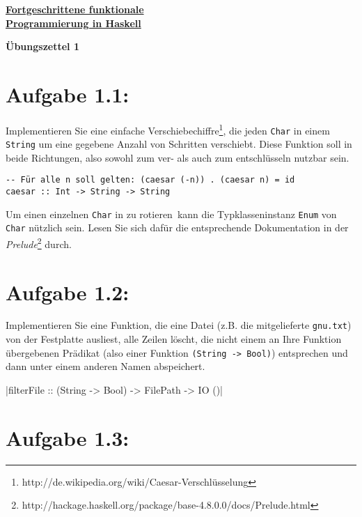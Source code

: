 \documentclass[a4paper,10pt]{scrartcl}
\newcommand{\underfat}[1]{\underline{\textbf{#1}}}
\newcommand{\theuebungszettel}{1}
\begin{document}
\begin{center}
  \begin{huge}
    \underfat{Fortgeschrittene funktionale}\\
    \underfat{Programmierung in Haskell}\\
  \end{huge}
\begin{LARGE}
\textbf{Übungszettel \theuebungszettel}

\end{LARGE}
\end{center}

\section*{Aufgabe \theuebungszettel.1:}

Implementieren Sie eine einfache Verschiebechiffre\footnote{http://de.wikipedia.org/wiki/Caesar-Verschlüsselung}, die jeden \texttt{Char} in einem \texttt{String} um eine gegebene Anzahl von Schritten verschiebt. Diese Funktion soll \glqq in beide Richtungen\grqq , also sowohl zum ver- als auch zum entschlüsseln nutzbar sein.

\begin{verbatim}
-- Für alle n soll gelten: (caesar (-n)) . (caesar n) = id 
caesar :: Int -> String -> String
\end{verbatim}

Um einen einzelnen \texttt{Char} in zu \glqq rotieren\grqq\ kann die Typklasseninstanz \texttt{Enum} von \texttt{Char} nützlich sein. Lesen Sie sich dafür die entsprechende Dokumentation in der \emph{Prelude}\footnote{http://hackage.haskell.org/package/base-4.8.0.0/docs/Prelude.html} durch.

\section*{Aufgabe \theuebungszettel.2:}

Implementieren Sie eine Funktion, die eine Datei (z.B. die mitgelieferte \texttt{gnu.txt}) von der Festplatte ausliest, alle Zeilen löscht, die nicht einem an Ihre Funktion übergebenen Prädikat (also einer Funktion \texttt{(String -> Bool)}) entsprechen und dann unter einem anderen Namen abspeichert.

|filterFile :: (String -> Bool) -> FilePath -> IO ()|

\section*{Aufgabe \theuebungszettel.3:}
\end{document}
